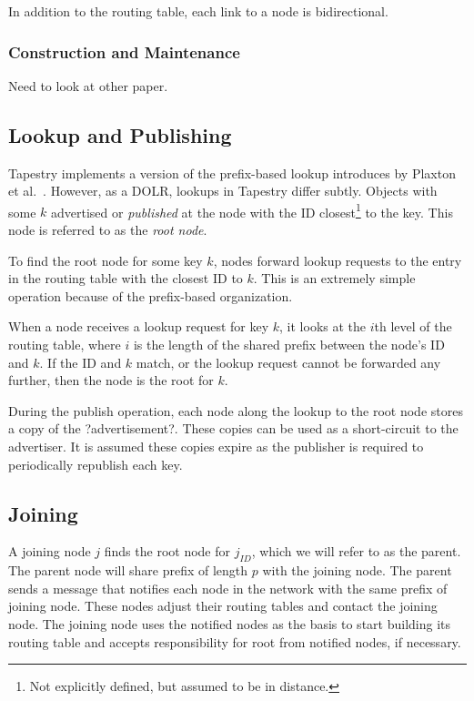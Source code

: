 \documentclass[10pt,letterpaper]{report}
\begin{document}
In addition to the routing table, each link to a node is bidirectional.


\subsubsection*{Construction and Maintenance}
Need to look at other paper.

\subsection*{Lookup and Publishing}
Tapestry \cite{tapestry} implements a version of the prefix-based lookup introduces by Plaxton et al.\ \cite{prr}. 
However, as a DOLR, lookups in Tapestry differ subtly.
Objects with some $k$ advertised or \textit{published} at the node with the ID closest\footnote{Not explicitly defined, but assumed to be in distance.} to the key.
This node is referred to as the \textit{root node}.

To find the root node for some key $k$, nodes forward lookup requests to the entry in the routing table with the closest ID to $k$. 
This is an extremely simple operation because of the prefix-based organization.

When a node receives a lookup request for key $k$, it looks at the $i$th level of the routing table, where $i$ is the length of the shared prefix between the node's ID and $k$.
If the ID and $k$ match, or the lookup request cannot be forwarded any further, then the node is the root for $k$.

During the publish operation, each node along the lookup to the root node stores a copy of the ?advertisement?. 
These copies can be used as a short-circuit to the advertiser.
It is assumed these copies expire as the publisher is required to periodically republish each key.



\subsection*{Joining}

A joining node $j$ finds the root node for $j_{ID}$, which we will refer to as the parent.
The parent node will share prefix of length $p$ with the joining node.
The parent sends a message  that notifies each node in the network with the same prefix of joining node.
These nodes adjust their routing tables and contact the joining node.
The joining node uses the notified nodes as the basis to start building its routing table and accepts responsibility for root from notified nodes, if necessary.
\end{document}
